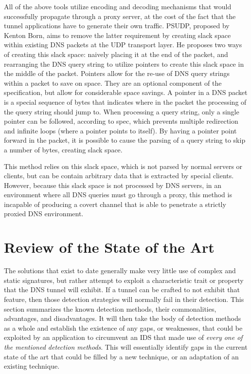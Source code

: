 \documentclass[12pt]{report}
\theoremstyle{remark}
\theoremstyle{definition}
\theoremstyle{definition}
\theoremstyle{definition}
\begin{document}
All of the above tools utilize encoding and decoding mechanisms that would
successfully propagate through a proxy server, at the cost of the fact that the
tunnel applications have to generate their own traffic. PSUDP, proposed by
Kenton Born, aims to remove the latter requirement by creating slack space
within existing DNS packets at the UDP transport layer. He proposes two ways
of creating this slack space: naively placing it at the end of the packet, and
rearranging the DNS query string to utilize pointers to create this slack space
in the middle of the packet. Pointers allow for the re-use of DNS query strings
within a packet to save on space. They are an optional component of the
specification, but allow for considerable space savings. A pointer in a DNS
packet is a special sequence of bytes that indicates where in the packet the
processing of the query string should jump to. When processing a query string,
only a single pointer can be followed, according to spec, which prevents
multiple redirection and infinite loops (where a pointer points to itself). By
having a pointer point forward in the packet, it is possible to cause the
parsing of a query string to skip a number of bytes, creating slack space.

This method relies on this slack space, which is not parsed by normal servers or
clients, but can be contain arbitrary data that is extracted by special clients.
However, because this slack space is not processed by DNS servers, in an
environment where all DNS queries must go through a proxy, this method is
incapable of producing a covert channel that is able to penetrate a strictly
proxied DNS environment.

\newpage

\chapter{Review of the State of the Art}
\label{litreview}
The solutions that exist to date generally make very little use of complex and
static signatures, but rather attempt to exploit a characteristic trait or
property that the DNS tunnel will exhibit. If a tunnel can be crafted to not
exhibit that feature, then those detection strategies will normally fail in
their detection. This section summarizes the known detection methods, their
commonalities, advantages, and disadvantages. It will then take the body of
detection methods as a whole and establish the existence of any gaps, or
weaknesses, that could be exploited by an application to circumvent an IDS that
made use of \emph{every one of the mentioned detection methods}. This will 
essentially identify gaps in the current state of the art that could be filled
by a new technique, or an adaptation of an existing technique.
\end{document}
